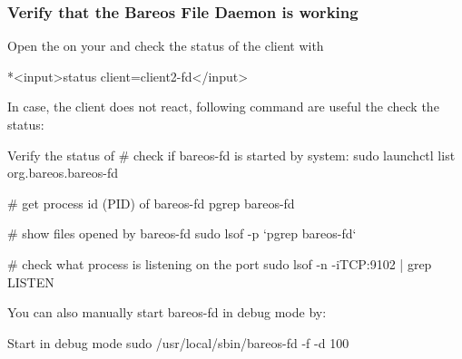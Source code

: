 % 


\subsubsection{Verify that the Bareos File Daemon is working}

Open the  on your \bareosDir and check the status of the client with

\begin{bconfig}{}
*<input>status client=client2-fd</input>
\end{bconfig}

In case, the client does not react, following command are useful the check the status:


\begin{commands}{Verify the status of \bareosFd}
# check if bareos-fd is started by system:
sudo launchctl list org.bareos.bareos-fd

# get process id (PID) of bareos-fd
pgrep bareos-fd

# show files opened by bareos-fd
sudo lsof -p `pgrep bareos-fd`

# check what process is listening on the \bareosFd port
sudo lsof -n -iTCP:9102 | grep LISTEN
\end{commands}

You can also manually start bareos-fd in debug mode by:

\begin{commands}{Start \bareosFd in debug mode}
sudo /usr/local/sbin/bareos-fd -f -d 100
\end{commands}
